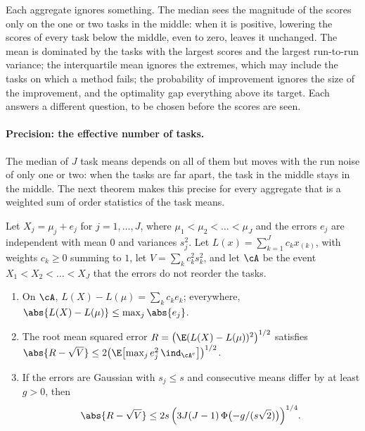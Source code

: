 \begin{refsection}
Each aggregate ignores something. The median sees the magnitude of the scores only on the one or two tasks in the middle: when it is positive, lowering the scores of every task below the middle, even to zero, leaves it unchanged. The mean is dominated by the tasks with the largest scores and the largest run-to-run variance; the interquartile mean ignores the extremes, which may include the tasks on which a method fails; the probability of improvement ignores the size of the improvement, and the optimality gap everything above its target. Each answers a different question, to be chosen before the scores are seen.

\paragraph{Precision: the effective number of tasks.} The median of $J$ task means depends on all of them but moves with the run noise of only one or two: when the tasks are far apart, the task in the middle stays in the middle. The next theorem makes this precise for every aggregate that is a weighted sum of order statistics of the task means.

\begin{theorem}\label{thm:aggregates:effective}
Let $X_j=\mu_j+e_j$ for $j=1,\dots,J$, where $\mu_1<\mu_2<\dots<\mu_J$ and the errors $e_j$ are independent with mean $0$ and variances $s_j^2$. Let $L(x)=\sum_{k=1}^Jc_kx_{(k)}$, with weights $c_k\ge0$ summing to $1$, let $V=\sum_kc_k^2s_k^2$, and let $\cA$ be the event $X_1<X_2<\dots<X_J$ that the errors do not reorder the tasks.
\begin{enumerate}
\item On $\cA$, $L(X)-L(\mu)=\sum_kc_ke_k$; everywhere, $\abs{L(X)-L(\mu)}\le\max_j\abs{e_j}$.
\item The root mean squared error $R=\bigl(\E(L(X)-L(\mu))^2\bigr)^{1/2}$ satisfies $\abs{R-\sqrt V}\le2\bigl(\E\bigl[\max_je_j^2\,\ind_{\cA^c}\bigr]\bigr)^{1/2}$.
\item If the errors are Gaussian with $s_j\le s$ and consecutive means differ by at least $g>0$, then
\begin{equation}\label{eq:aggregates:effbound}
  \abs{R-\sqrt V}\le2s\,\Bigl(3J(J-1)\,\Phi\bigl(-g/(s\sqrt2)\bigr)\Bigr)^{1/4}.
\end{equation}
\end{enumerate}
\end{theorem}


\end{refsection}
